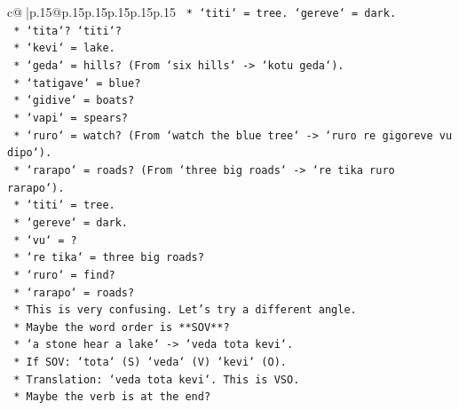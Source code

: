 \documentclass{article}
\begin{document}
{\begin{supertabular}{c@{$\;$}|p{.15\linewidth}@{}p{.15\linewidth}p{.15\linewidth}p{.15\linewidth}p{.15\linewidth}p{.15\linewidth}}
{{{\texttt{                                    *   `titi` = tree. `gereve` = dark.} \\
\texttt{                                    *   `tita`? `titi`?} \\
\texttt{                                    *   `kevi` = lake.} \\
\texttt{                                    *   `geda` = hills? (From `six hills` {-}> `kotu geda`).} \\
\texttt{                                    *   `tatigave` = blue?} \\
\texttt{                                    *   `gidive` = boats?} \\
\texttt{                                    *   `vapi` = spears?} \\
\texttt{                                    *   `ruro` = watch? (From `watch the blue tree` {-}> `ruro re gigoreve vu dipo`).} \\
\texttt{                                    *   `rarapo` = roads? (From `three big roads` {-}> `re tika ruro rarapo`).} \\
\texttt{                                    *   `titi` = tree.} \\
\texttt{                                    *   `gereve` = dark.} \\
\texttt{                                    *   `vu` = ?} \\
\texttt{                                    *   `re tika` = three big roads?} \\
\texttt{                                    *   `ruro` = find?} \\
\texttt{                                    *   `rarapo` = roads?} \\
\texttt{                                    *   This is very confusing. Let's try a different angle.} \\
\texttt{                                    *   Maybe the word order is **SOV**?} \\
\texttt{                                        *   `a stone hear a lake` {-}> `veda tota kevi`.} \\
\texttt{                                        *   If SOV: `tota` (S) `veda` (V) `kevi` (O).} \\
\texttt{                                        *   Translation: `veda tota kevi`. This is VSO.} \\
\texttt{                                    *   Maybe the verb is at the end?} \\
}}}
\end{supertabular}}
\end{document}
